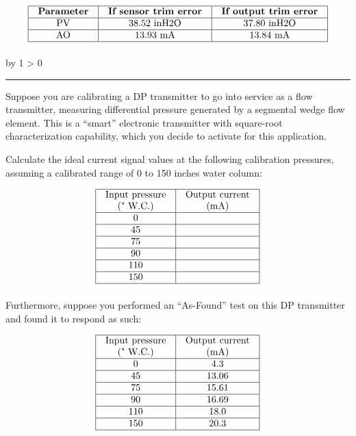 \documentclass[12pt,a4paper]{article}
\def\oppgave{
            \advance\questnum by 1
            \ifnum \questnum > 0
                 \hrule
                 \vskip 3pt
                 \leftline{Oppgave \the\questnum}
                 \vskip 3pt \fi}
\begin{document}
$$\vbox{\offinterlineskip
\halign{\strut
\vrule \quad\hfil # \ \hfil & 
\vrule \quad\hfil # \ \hfil & 
\vrule \quad\hfil # \ \hfil \vrule \cr
\noalign{\hrule}
%
{\bf Parameter} & {\bf If sensor trim error} & {\bf If output trim error} \cr
%
\noalign{\hrule}
%
PV & 38.52 inH2O & 37.80 inH2O \cr
%
\noalign{\hrule}
%
AO & 13.93 mA & 13.84 mA \cr
%
\noalign{\hrule}
} %
}$$ %



\vfil \eject 

\oppgave{} 

Suppose you are calibrating a DP transmitter to go into service as a flow transmitter, measuring differential pressure generated by a segmental wedge flow element.  This is a ``smart'' electronic transmitter with square-root characterization capability, which you decide to activate for this application.

Calculate the ideal current signal values at the following calibration pressures, assuming a calibrated range of 0 to 150 inches water column:


$$\vbox{\offinterlineskip
\halign{\strut
\vrule \quad\hfil # \ \hfil & 
\vrule \quad\hfil # \ \hfil \vrule \cr
\noalign{\hrule}
%
Input pressure & Output current \cr
(" W.C.) & (mA) \cr
%
\noalign{\hrule}
%
0 &  \cr
%
\noalign{\hrule}
%
45 &  \cr
%
\noalign{\hrule}
%
75 &  \cr
%
\noalign{\hrule}
%
90 &  \cr
%
\noalign{\hrule}
%
110 &  \cr
%
\noalign{\hrule}
%
150 &  \cr
%
\noalign{\hrule}
} %
}$$ %

Furthermore, suppose you performed an ``As-Found'' test on this DP transmitter and found it to respond as such:


$$\vbox{\offinterlineskip
\halign{\strut
\vrule \quad\hfil # \ \hfil & 
\vrule \quad\hfil # \ \hfil \vrule \cr
\noalign{\hrule}
%
Input pressure & Output current \cr
(" W.C.) & (mA) \cr
%
\noalign{\hrule}
%
0 & 4.3 \cr
%
\noalign{\hrule}
%
45 & 13.06 \cr
%
\noalign{\hrule}
%
75 & 15.61 \cr
%
\noalign{\hrule}
%
90 & 16.69 \cr
%
\noalign{\hrule}
%
110 & 18.0 \cr
%
\noalign{\hrule}
%
150 & 20.3 \cr
%
\noalign{\hrule}
} %
}$$ %
\end{document}
